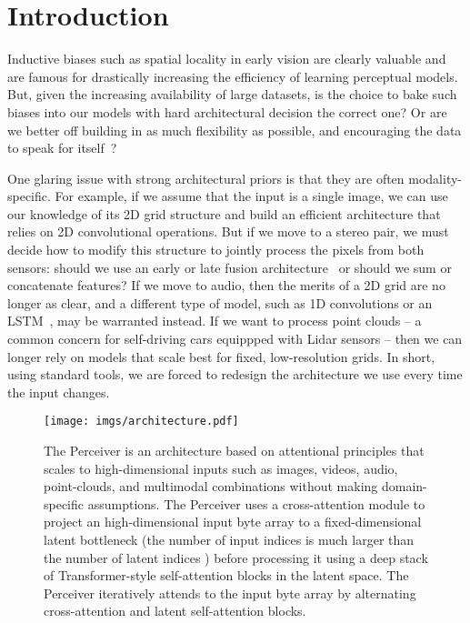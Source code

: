 \documentclass{article}
\begin{document}
\section{Introduction}
\label{submission}

Inductive biases such as spatial locality in early vision are clearly valuable and are famous for drastically increasing the efficiency of learning perceptual models. But, given the increasing availability of large datasets, is the choice to bake such biases into our models with hard architectural decision the correct one? Or are we better off building in as much flexibility as possible, and encouraging the data to speak for itself~\cite{lecun2015deep}?

One glaring issue with strong architectural priors is that they are often modality-specific. For example, if we assume that the input is a single image, we can use our knowledge of its 2D grid structure and build an efficient architecture that relies on 2D convolutional operations. But if we move to a stereo pair, we must decide how to modify this structure to jointly process the pixels from both sensors: should we use an early or late fusion architecture~\cite{karpathy2014largescale} or should we sum or concatenate features? If we move to audio, then the merits of a 2D grid are no longer as clear, and a different type of model, such as 1D convolutions or an LSTM~\cite{hochreiter1997long,6638947}, may be warranted instead. If we want to process point clouds -- a common concern for self-driving cars equippped with Lidar sensors -- then we can longer rely on models that scale best for fixed, low-resolution grids. In short, using standard tools, we are forced to redesign the architecture we use every time the input changes.

\begin{figure*}[t]
    \centering
    \texttt{[image: imgs/architecture.pdf]}
    \vspace{-10pt}
    \caption{The Perceiver is an architecture based on attentional principles that scales to high-dimensional inputs such as images, videos, audio, point-clouds, and multimodal combinations without making domain-specific assumptions. The Perceiver uses a cross-attention module to project an high-dimensional input byte array to a fixed-dimensional latent bottleneck (the number of input indices  is much larger than the number of latent indices ) before processing it using a deep stack of Transformer-style self-attention blocks in the latent space. The Perceiver iteratively attends to the input byte array by alternating cross-attention and latent self-attention blocks.}
    \label{fig:architecture}
    \vspace{-8pt}
\end{figure*}
\end{document}
